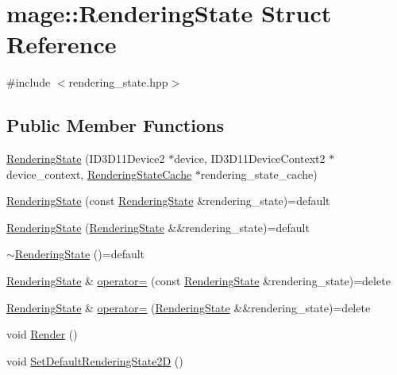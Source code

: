 \hypertarget{structmage_1_1_rendering_state}{}\section{mage\+:\+:Rendering\+State Struct Reference}
\label{structmage_1_1_rendering_state}


{\ttfamily \#include $<$rendering\+\_\+state.\+hpp$>$}

\subsection*{Public Member Functions}
\begin{DoxyCompactItemize}
\item 
\hyperlink{structmage_1_1_rendering_state_a6a1914effafb160ff1d05c8a1963278a}{Rendering\+State} (I\+D3\+D11\+Device2 $\ast$device, I\+D3\+D11\+Device\+Context2 $\ast$device\+\_\+context, \hyperlink{structmage_1_1_rendering_state_cache}{Rendering\+State\+Cache} $\ast$rendering\+\_\+state\+\_\+cache)
\item 
\hyperlink{structmage_1_1_rendering_state_ac5e435a581734fd62d8a5ce344c4a998}{Rendering\+State} (const \hyperlink{structmage_1_1_rendering_state}{Rendering\+State} \&rendering\+\_\+state)=default
\item 
\hyperlink{structmage_1_1_rendering_state_abea7eb2c63fd3b81a7c0940a2d70c78b}{Rendering\+State} (\hyperlink{structmage_1_1_rendering_state}{Rendering\+State} \&\&rendering\+\_\+state)=default
\item 
\hyperlink{structmage_1_1_rendering_state_a91f1168a2fab59b2a5d49082576d5d01}{$\sim$\+Rendering\+State} ()=default
\item 
\hyperlink{structmage_1_1_rendering_state}{Rendering\+State} \& \hyperlink{structmage_1_1_rendering_state_af03ad38dd9b88949fc9d3603e4829c26}{operator=} (const \hyperlink{structmage_1_1_rendering_state}{Rendering\+State} \&rendering\+\_\+state)=delete
\item 
\hyperlink{structmage_1_1_rendering_state}{Rendering\+State} \& \hyperlink{structmage_1_1_rendering_state_ad16e9963683b1eda6cbe675b8b210368}{operator=} (\hyperlink{structmage_1_1_rendering_state}{Rendering\+State} \&\&rendering\+\_\+state)=delete
\item 
void \hyperlink{structmage_1_1_rendering_state_a0a95ff66f5a136aceab2b7836c4d220c}{Render} ()
\item 
void \hyperlink{structmage_1_1_rendering_state_aa8279c1177941c8f14502fc9c7296655}{Set\+Default\+Rendering\+State2D} ()

\end{DoxyCompactItemize}
